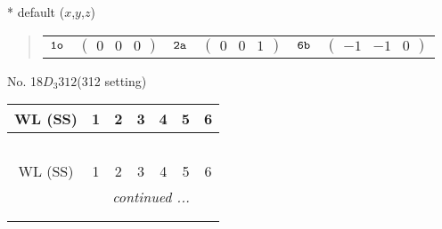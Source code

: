 \documentclass[fleqn,9pt,landscape]{jsarticle}
\begin{document}
* default ($x$,$y$,$z$)
\begin{quote}
\begin{tabular}{cccccc}
$ {\tt 1o} $ & $ \begin{pmatrix} 0 & 0 & 0 \end{pmatrix} $ & $ {\tt 2a} $ & $ \begin{pmatrix} 0 & 0 & 1 \end{pmatrix} $ & $ {\tt 6b} $ & $ \begin{pmatrix} -1 & -1 & 0 \end{pmatrix} $
\end{tabular}
\end{quote}
\newpage
No. 18\quad$D_{3}$\quad$312$\quad(312 setting)\quad[ trigonal ]
\begin{center}
\renewcommand{\arraystretch}{1.2}
\begin{longtable}{ccccccc}
 \hline \hline
WL (SS) & 1 & 2 & 3 & 4 & 5 & 6 \\ \hline \endfirsthead

\multicolumn{6}{l}{\tablename\ \thetable{}} \\
 \hline \hline
WL (SS) & 1 & 2 & 3 & 4 & 5 & 6 \\ \hline \endhead

 \hline \hline
\multicolumn{6}{r}{\footnotesize\it continued ...} \\ \endfoot

 \hline \hline
\multicolumn{6}{r}{} \\ \endlastfoot


\end{longtable}
\end{center}
\end{document}
